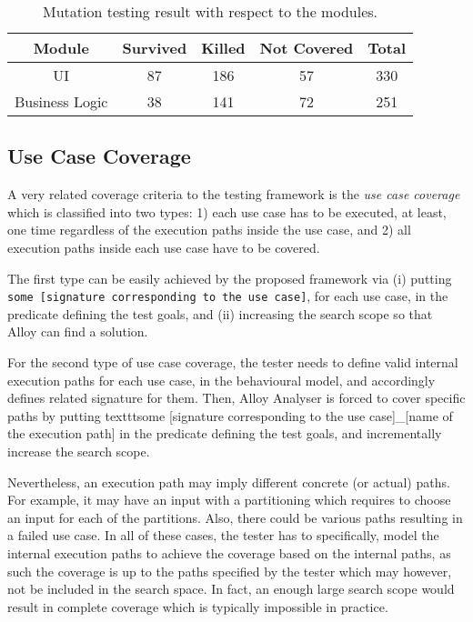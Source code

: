 \begin{table}[!t]
\caption{Mutation testing result with respect to the modules.}
\label{tbl:case-study-mutation-module}
\centering
\begin{tabular}{|c|c|c|c|c|}
\hline
Module & Survived & Killed & Not Covered & Total \\ \hline
UI & 87 & 186 & 57 & 330 \\ \hline
Business Logic & 38 & 141 & 72 & 251 \\
\hline
\end{tabular}
\end{table}

\subsection{Use Case Coverage}
\label{sec:case-study-usecase-coverage}
A very related coverage criteria to the testing framework is the \textit{use case coverage} which is classified into two types: 1) each use case has to be executed, at least, one time regardless of the execution paths inside the use case, and 2) all execution paths inside each use case have to be covered.

The first type can be easily achieved by the proposed framework via (i) putting \texttt{some [signature corresponding to the use case]}, for each use case, in the predicate defining the test goals, and (ii) increasing the search scope so that Alloy can find a solution. 

For the second type of use case coverage, the tester needs to define valid internal execution paths for each use case, in the behavioural model, and accordingly defines related signature for them. Then, Alloy Analyser is forced to cover specific paths by putting texttt{some [signature corresponding to the use case]\_[name of the execution path]} in the predicate defining the test goals, and incrementally increase the search scope.

Nevertheless, an execution path may imply different concrete (or actual) paths. For example, it may have an input with a partitioning which requires to choose an input for each of the partitions. Also, there could be various paths resulting in a failed use case. In all of these cases, the tester has to specifically, model the internal execution paths to achieve the coverage  based on the internal paths, as such the coverage is up to the paths specified by the tester which may however, not be included in the search space. In fact, an enough large search scope would result in complete coverage which is typically impossible in practice.

